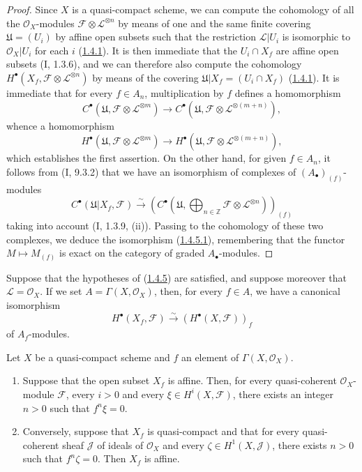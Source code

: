 \begin{proof}
Since $X$ is a quasi-compact scheme, we can compute the cohomology of
all the $\mathcal O_X$-modules
$\mathcal F\otimes\mathcal L^{\otimes n}$ by means of one and the same
finite covering $\mathfrak U=(U_i)$ by affine open subsets such that the
restriction $\mathcal L\vert U_i$ is isomorphic to $\mathcal O_X\vert U_i$
for each $i$ (\hyperref[III.1.4.1]{1.4.1}). It is then immediate that the
$U_i\cap X_f$ are affine open subsets (I, 1.3.6), and we can therefore also
compute the cohomology
$H^\bullet(X_f,\mathcal F\otimes\mathcal L^{\otimes n})$ by means of the
covering $\mathfrak U\vert X_f=(U_i\cap X_f)$
(\hyperref[III.1.4.1]{1.4.1}). It is immediate that for every $f\in A_n$,
multiplication by $f$ defines a homomorphism
\[
C^\bullet(\mathfrak U,\mathcal F\otimes\mathcal L^{\otimes m})
\longrightarrow
C^\bullet(\mathfrak U,\mathcal F\otimes\mathcal L^{\otimes(m+n)}),
\]
whence a homomorphism
\[
H^\bullet(\mathfrak U,\mathcal F\otimes\mathcal L^{\otimes m})
\longrightarrow
H^\bullet(\mathfrak U,\mathcal F\otimes\mathcal L^{\otimes(m+n)}),
\]
which establishes the first assertion. On the other hand, for given
$f\in A_n$, it follows from (I, 9.3.2) that we have an isomorphism of
complexes of $(A_\bullet)_{(f)}$-modules
\[
C^\bullet(\mathfrak U\vert X_f,\mathcal F)
\xrightarrow{\sim}
\left(C^\bullet\left(\mathfrak U,
\bigoplus_{n\in\mathbb Z}\mathcal F\otimes\mathcal L^{\otimes n}
\right)\right)_{(f)}
\]
taking into account (I, 1.3.9, (ii)). Passing to the cohomology of these two
complexes, we deduce the isomorphism
(\hyperref[III.1.4.5.1]{1.4.5.1}), remembering that the functor
$M\mapsto M_{(f)}$ is exact on the category of graded
$A_\bullet$-modules.
\end{proof}

\begin{corollary}[1.4.6]
\label{III.1.4.6}
Suppose that the hypotheses of
(\hyperref[III.1.4.5]{1.4.5}) are satisfied, and suppose moreover that
$\mathcal L=\mathcal O_X$. If we set $A=\Gamma(X,\mathcal O_X)$, then,
for every $f\in A$, we have a canonical isomorphism
\[
H^\bullet(X_f,\mathcal F)
\xrightarrow{\sim}(H^\bullet(X,\mathcal F))_f
\]
of $A_f$-modules.
\end{corollary}

\begin{corollary}[1.4.7]
\label{III.1.4.7}
Let $X$ be a quasi-compact scheme and $f$ an element of
$\Gamma(X,\mathcal O_X)$.
\begin{enumerate}
\item[(i)] Suppose that the open subset $X_f$ is affine. Then, for every
quasi-coherent $\mathcal O_X$-module $\mathcal F$, every $i>0$ and every
$\xi\in H^i(X,\mathcal F)$, there exists an integer $n>0$ such that $f^n\xi=0$.
\item[(ii)] Conversely, suppose that $X_f$ is quasi-compact and that for
every quasi-coherent sheaf $\mathcal J$ of ideals of $\mathcal O_X$ and every
$\zeta\in H^1(X,\mathcal J)$, there exists $n>0$ such that $f^n\zeta=0$.
Then $X_f$ is affine.
\end{enumerate}
\end{corollary}

